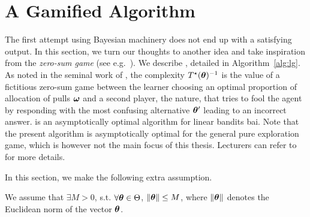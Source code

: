 \section{A Gamified Algorithm}\label{sec:lgc.game}

The first attempt using Bayesian machinery does not end up with a satisfying output. In this section, we turn our thoughts to another idea and take inspiration from the \emph{zero-sum game} (see e.g.~\citealt{degenne2019pure}). We describe \LG{}, detailed in Algorithm~\ref{alg:lg}. As noted in the seminal work of \citet{chernoff1959}, the complexity $T^{\star}({\boldsymbol \theta})^{-1}$ is the value of a fictitious zero-sum game between the learner choosing an optimal proportion of allocation of pulls ${\boldsymbol \omega}$ and a second player, the nature, that tries to fool the agent by responding with the most confusing alternative ${\boldsymbol \theta}'$ leading to an incorrect answer. \LG{} is an asymptotically optimal algorithm for linear bandits \gls{bai}. Note that the present algorithm is asymptotically optimal for the general pure exploration game, which is however not the main focus of this thesis. Lecturers can refer to~\cite{degenne2020game} for more details.

In this section, we make the following extra assumption.
\begin{assumption}\label{ass:lgc.bounded_parameter}
\begin{leftbar}[assumptionbar]
We assume that $\exists M>0$, s.t. $\forall {\boldsymbol \theta}\in\Theta$, $\left\lVert{\boldsymbol \theta}\right\rVert \leq M$, where $\left\lVert{\boldsymbol \theta}\right\rVert$ denotes the Euclidean norm of the vector ${\boldsymbol \theta}$. 
\end{leftbar}
\end{assumption}






